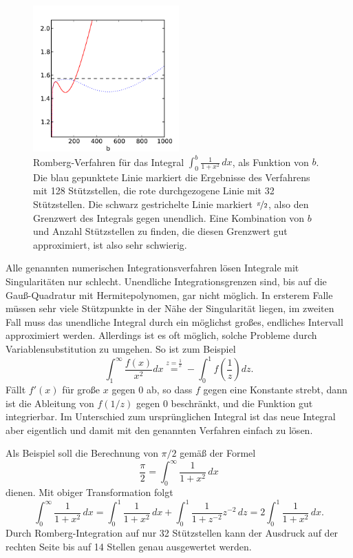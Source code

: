 \begin{figure}
  \centering
  \includegraphics[width=0.5\textwidth]{plots/inf_int}
  \caption{Romberg-Verfahren für das Integral $\int_0^{b}
    \frac{1}{1+x^2}\, dx$, als Funktion von $b$. Die blau gepunktete
    Linie markiert die Ergebnisse des Verfahrens mit 128 Stützstellen,
    die rote durchgezogene Linie mit 32 Stützstellen. Die schwarz
    gestrichelte Linie markiert $\nicefrac{\pi}{2}$, also den
    Grenzwert des Integrals gegen unendlich. Eine Kombination von $b$
    und Anzahl Stützstellen zu finden, die diesen Grenzwert gut
    approximiert, ist also sehr schwierig.}
  \label{fig:inf_int}
\end{figure}

Alle genannten numerischen Integrationsverfahren lösen Integrale mit
Singularitäten nur schlecht. Unendliche Integrationsgrenzen sind, bis
auf die Gauß-Quadratur mit Hermitepolynomen, gar nicht möglich. In
ersterem Falle müssen sehr viele Stützpunkte in der Nähe der
Singularität liegen, im zweiten Fall muss das unendliche Integral
durch ein möglichst großes, endliches Intervall approximiert
werden. Allerdings ist es oft möglich, solche Probleme durch
Variablensubstitution zu umgehen. So ist zum Beispiel
\begin{equation}
  \int_1^{\infty} \frac{f(x)}{x^2}dx \stackrel{z = \frac{1}{x}}{=}
  - \int_0^1 f\left(\frac{1}{z}\right)dz.
\end{equation}
Fällt $f'(x)$ für große $x$ gegen $0$ ab, so dass $f$ gegen eine
Konstante strebt, dann ist die Ableitung von $f(1/z)$ gegen $0$
beschränkt, und die Funktion gut integrierbar. Im Unterschied zum
ursprünglichen Integral ist das neue Integral aber eigentlich und
damit mit den genannten Verfahren einfach zu lösen.

Als Beispiel soll die Berechnung von $\pi/2$ gemäß der Formel
\begin{equation}
  \frac{\pi}{2} = \int_0^{\infty} \frac{1}{1+x^2}\, dx
\end{equation}
dienen. Mit obiger Transformation folgt
\begin{equation}
  \int_0^{\infty} \frac{1}{1+x^2}\, dx
  = \int_0^1 \frac{1}{1+x^2}\, dx +  \int_0^1 \frac{1}{1+z^{-2}}z^{-2}\, dz
  = 2\int_0^1 \frac{1}{1+x^2}\, dx.
\end{equation}
Durch Romberg-Integration auf nur 32 Stützstellen kann der Ausdruck
auf der rechten Seite bis auf 14 Stellen genau ausgewertet
werden.

